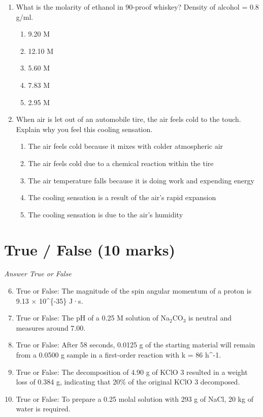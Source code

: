\documentclass[12pt]{article}
\begin{document}
\begin{enumerate}[label=\arabic*.]
\item What is the molarity of ethanol in 90-proof whiskey? Density of alcohol = 0.8 g/ml.
\begin{enumerate}[label=(\alph*)]
    \item 9.20 M
    \item 12.10 M
    \item 5.60 M
    \item 7.83 M
    \item 2.95 M
\end{enumerate}
\item When air is let out of an automobile tire, the air feels cold to the touch. Explain why you feel this cooling sensation.
\begin{enumerate}[label=(\alph*)]
    \item The air feels cold because it mixes with colder atmospheric air
    \item The air feels cold due to a chemical reaction within the tire
    \item The air temperature falls because it is doing work and expending energy
    \item The cooling sensation is a result of the air's rapid expansion
    \item The cooling sensation is due to the air's humidity
\end{enumerate}
\end{enumerate}

\section*{True / False (10 marks)}
\textit{Answer True or False}
\begin{enumerate}[label=\arabic*.]
\setcounter{enumi}{5}
\item True or False: The magnitude of the spin angular momentum of a proton is 9.13 \ensuremath{\times} 10^\{-35\} J·s.
\item True or False: The pH of a 0.25 M solution of Na$_{2}$CO$_{3}$ is neutral and measures around 7.00.
\item True or False: After 58 seconds, 0.0125 g of the starting material will remain from a 0.0500 g sample in a first-order reaction with k = 86 h^-1.
\item True or False: The decomposition of 4.90 g of KClO 3 resulted in a weight loss of 0.384 g, indicating that 20\% of the original KClO 3 decomposed.
\item True or False: To prepare a 0.25 molal solution with 293 g of NaCl, 20 kg of water is required.
\end{enumerate}
\end{document}
